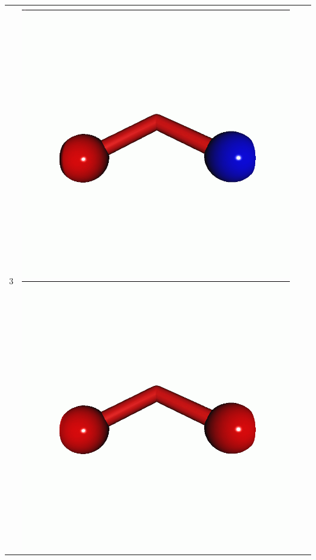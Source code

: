 \documentclass[journal=jctcce,manuscript=article]{achemso}
\begin{document}
\begin{table}[H]
\begin{tabular}{ c | c c c }
\begin{minipage}{0.2\textwidth}
    \end{minipage}
    \\
            3 &  
    \begin{minipage}{0.2\textwidth}
        \centering
        \includegraphics[scale=0.10]{NTO/O3/3h_063.png}
        \includegraphics[scale=0.10]{NTO/O3/3h_019.png}

\end{minipage}
\end{tabular}
\end{table}
\end{document}

